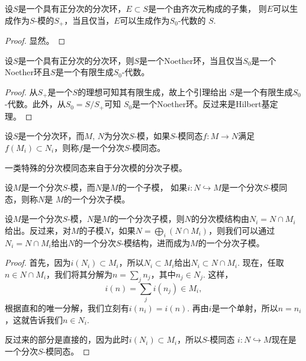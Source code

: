 \begin{lem}
	设$S$是一个具有正分次的分次环，$E\subset S$是一个由齐次元构成的子集，
	则$E$可以生成作为$S$-模的$S_+$，当且仅当，$E$可以生成作为$S_0$-代数的
	$S$.
\end{lem}

\begin{proof}
	显然。
\end{proof}

\begin{pro}
	设$S$是一个具有正分次的分次环，则$S$是一个Noether环，当且仅当$S_0$是一个
	Noether环且$S$是一个有限生成$S_0$-代数。
\end{pro}

\begin{proof}
	从$S_+$是一个$S$的理想可知其有限生成，故上个引理给出
	$S$是一个有限生成$S_0$-代数。此外，从$S_0=S/S_+$可知
	$S_0$是一个Noether环。反过来是Hilbert基定理。
\end{proof}

\begin{para}[分次模同态]
	设$S$是一个分次环，而$M$, $N$为分次$S$-模，如果$S$-模同态$f:M\to N$满足
	$f(M_i)\subset N_i$，则称$f$是一个分次$S$-模同态。
\end{para}

一类特殊的分次模同态来自于分次模的分次子模。

\begin{para}[分次子模]
设$M$是一个分次$S$-模，而$N$是$M$的一个子模，
如果$i:N\hookrightarrow M$是一个分次$S$-模同态，则称$N$是
$M$的一个分次子模。
\end{para}

\begin{lem}
设$M$是一个分次$S$-模，$N$是$M$的一个分次子模，则$N$的分次模结构由$N_i=N\cap M_i$给出。反过来，对$M$的子模$N$，如果$N=\bigoplus_i (N\cap M_i)$，则我们可以通过$N_i=N\cap M_i$给出$N$的一个分次$S$-模结构，进而成为$M$的一个分次子模。
\end{lem}

\begin{proof}
首先，因为$i(N_i)\subset M_i$，所以$N_i\subset M_i$给出$N_i\subset N\cap M_i$. 
现在，任取$n\in N\cap M_i$，我们将其分解为$n=\sum_j n_j$，其中$n_j\in N_j$. 
这样，
\[
	i(n)=\sum_j i(n_j)\in M_i,
\]
根据直和的唯一分解，我们立刻有$i(n_i)=i(n)$. 再由$i$是一个单射，所以$n=n_i$，这就告诉我们$n\in N_i$.

反过来的部分是直接的，因为此时$i(N_i)\subset M_i$，所以$S$-模同态
$i:N\hookrightarrow M$现在是一个分次$S$-模同态。
\end{proof}

